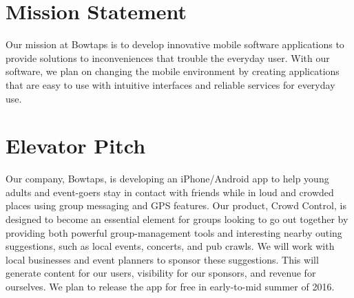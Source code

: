 
\section{Mission Statement}
Our mission at Bowtaps is to develop innovative mobile software applications to provide solutions to inconveniences that trouble the everyday user. With our software, we plan on changing the mobile environment by creating applications that are easy to use with  intuitive interfaces and reliable services for everyday use.  

\section{Elevator Pitch}

Our company, Bowtaps, is developing an iPhone/Android app to help young adults and event-goers stay in contact with friends while in loud and crowded places using group messaging and GPS features.
\newline\newline
Our product, Crowd Control, is designed to become an essential element for groups looking to go out together by providing both powerful group-management tools and interesting nearby outing suggestions, such as local events, concerts, and pub crawls.
\newline\newline
We will work with local businesses and event planners to sponsor these suggestions. This will generate content for our users, visibility for our sponsors, and revenue for ourselves.
\newline \newline
We plan to release the app for free in early-to-mid summer of 2016.
